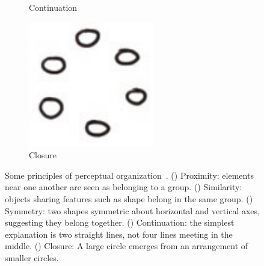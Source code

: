 \begin{figure}
\begin{subfigure}[b]{28mm}
    \caption{Continuation}
    \label{fig:gestalt-continuation}
  \end{subfigure}
  \hspace{2mm}
  \begin{subfigure}[b]{28mm} 
    \includegraphics[width=\textwidth]{img/gestalt-closure.pdf} 
    \caption{Closure}
    \label{fig:gestalt-closure}
  \end{subfigure}
  \caption[Gestalt perceptual organization]{Some principles of
    perceptual organization~\cite{kanizsa-gestalt}.
    () Proximity: elements near one
    another are seen as belonging to a
    group. () Similarity: objects
    sharing features such as shape belong in the same
    group. () Symmetry: two shapes
    symmetric about horizontal and vertical axes, suggesting they
    belong together. () Continuation:
    the simplest explanation is two straight lines, not four lines
    meeting in the middle. () Closure: A
    large circle emerges from an arrangement of smaller circles.}
  \label{fig:gestalt}
\end{figure}
